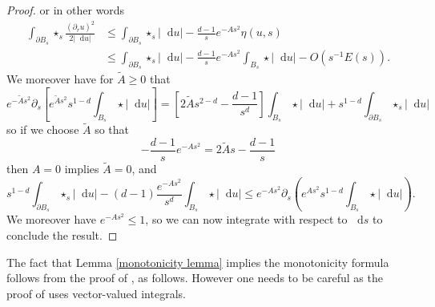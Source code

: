 \documentclass[reqno,10pt]{amsart}
\newcommand*\dif{\mathop{}\!\mathrm{d}}
\theoremstyle{definition}
\numberwithin{equation}{section}
\begin{document}
\begin{proof}
or in other words
\begin{align*}
\int_{\partial B_s} \star_s \frac{(\partial_r u)^2}{2|\dif u|} &\leq \int_{\partial B_s} \star_s |\dif u| - \frac{d - 1}{s} e^{-As^2} \eta(u, s)\\
&\leq \int_{\partial B_s} \star_s |\dif u| - \frac{d - 1}{s} e^{-As^2} \int_{B_s} \star |\dif u| - O(s^{-1}E(s)).
\end{align*}
We moreover have for $\tilde A \geq 0$ that
$$e^{-\tilde As^2} \partial_s \left[e^{\tilde As^2} s^{1 - d} \int_{B_s} \star |\dif u|\right] = \left[2\tilde As^{2 - d} - \frac{d - 1}{s^d}\right]\int_{B_s} \star |\dif u| + s^{1 - d} \int_{\partial B_s} \star_s |\dif u|$$
so if we choose $\tilde A$ so that
$$-\frac{d - 1}{s} e^{-As^2} = 2\tilde As - \frac{d - 1}{s}$$
then $A = 0$ implies $\tilde A = 0$, and
$$s^{1 - d} \int_{\partial B_s} \star_s |\dif u| - (d - 1)\frac{e^{-As^2}}{s^d} \int_{B_s} \star|\dif u| \leq e^{-As^2} \partial_s\left(e^{As^2} s^{1 - d} \int_{B_s} \star|\dif u|\right).$$
We moreover have $e^{-As^2} \leq 1$, so we can now integrate with respect to $\dif s$ to conclude the result.
\end{proof}

The fact that Lemma \ref{monotonicity lemma} implies the monotonicity formula follows from the proof of \cite[Proposition 5.12]{Giusti77}, as follows.
However one needs to be careful as the proof of \cite{Giusti77} uses vector-valued integrals.
\end{document}
